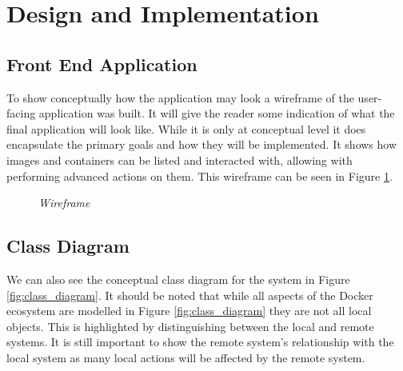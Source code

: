 \section{Design and Implementation}

\subsection{Front End Application}

To show conceptually how the application may look a wireframe of the user-facing application was built. It will give the reader some indication of what the final application will look like. While it is only at conceptual level it does encapsulate the primary goals and how they will be implemented. It shows how images and containers can be listed and interacted with, allowing with performing advanced actions on them. This wireframe can be seen in Figure \ref{fig:wireframe}.
\begin{figure}[!ht]
\centering
{}
\caption{\em Wireframe}
\label{fig:wireframe}
\end{figure}

\subsection{Class Diagram}
We can also see the conceptual class diagram for the system in Figure \ref{fig:class_diagram}. It should be noted that while all aspects of the Docker ecosystem are modelled in Figure \ref{fig:class_diagram} they are not all local objects. This is highlighted by distinguishing between the local and remote systems. It is still important to show the remote system's relationship with the local system as many local actions will be affected by the remote system.

